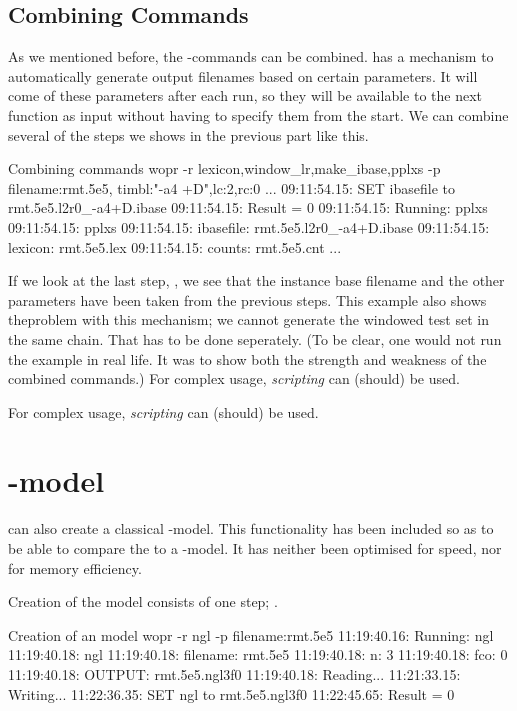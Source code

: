 \documentclass[a4paper,10pt,twoside]{report}
\begin{document}
\subsection{Combining Commands}

As we mentioned before, the \wopr{}-commands can be combined. \Wopr{}
has a mechanism to automatically generate output filenames based on
certain parameters. It will  come of these parameters after
each run, so they will be available to the next function as input
without having to specify them from the start. We can combine several
of the steps we shows in the previous part like this.

\begin{bash}{Combining commands}
wopr -r lexicon,window_lr,make_ibase,pplxs -p filename:rmt.5e5,
                                              timbl:"-a4 +D",lc:2,rc:0
...
09:11:54.15: SET ibasefile to rmt.5e5.l2r0_-a4+D.ibase
09:11:54.15: Result = 0
09:11:54.15: Running: pplxs
09:11:54.15: pplxs
09:11:54.15:  ibasefile:      rmt.5e5.l2r0_-a4+D.ibase
09:11:54.15:  lexicon:        rmt.5e5.lex
09:11:54.15:  counts:         rmt.5e5.cnt
...
\end{bash}

If we look at the last step, , we see that the instance
base filename and the other parameters have been taken from the
previous steps. This example also shows theproblem with this
mechanism; we cannot generate the windowed test set in the same
chain. That has to be done seperately. (To be clear, one would not run
the example in real life. It was to show both the strength and
weakness of the combined commands.) For complex \wopr{} usage,
\emph{scripting} can (should) be used.

For complex \wopr{} usage, \emph{scripting} can (should) be used.

\section{\ngram{}-model}

\Wopr{} can also create a classical \ngram{}-model. This functionality
has been included so as to be able to compare the \mb{} \lm{} to a 
 \ngram{}-model. It has neither been optimised for speed,
nor for memory efficiency.

Creation of the model consists of one step; .

\begin{bash}{Creation of an \ngram{} model}
wopr -r ngl -p filename:rmt.5e5
11:19:40.16: Running: ngl
11:19:40.18: ngl
11:19:40.18:  filename:  rmt.5e5
11:19:40.18:  n:         3
11:19:40.18:  fco:       0
11:19:40.18:  OUTPUT:    rmt.5e5.ngl3f0
11:19:40.18: Reading...
11:21:33.15: Writing...
11:22:36.35: SET ngl to rmt.5e5.ngl3f0
11:22:45.65: Result = 0
\end{bash}
\end{document}
